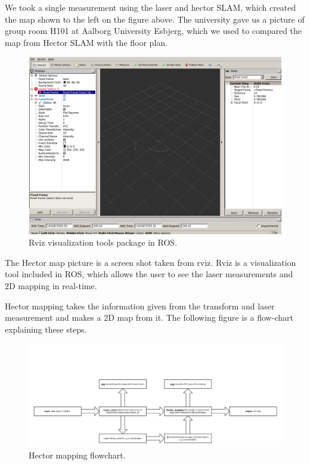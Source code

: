 We took a single measurement using the laser and hector SLAM, which created the map shown to the left on the figure above. The university gave us a picture of group room H101 at Aalborg University Esbjerg, which we used to compared the map from Hector SLAM with the floor plan. 

\begin{figure}[H]
	\centering
	\includegraphics[width=.5\linewidth]{images/rviz.png}
	\caption{Rviz visualization tools package in ROS.}
\end{figure}

The Hector map picture is a screen shot taken from rviz. Rviz is a visualization tool included in ROS, which allows the user to see the laser measurements and 2D mapping in real-time.\cite{rviz}

Hector mapping takes the information given from the transform and laser measurement and makes a 2D map from it. The following figure is a flow-chart explaining these steps.

\begin{figure}[H]
	\centering
	\includegraphics[width=1\linewidth]{images/hector_flow.png}
	\caption{Hector mapping flowchart.}
\end{figure}
